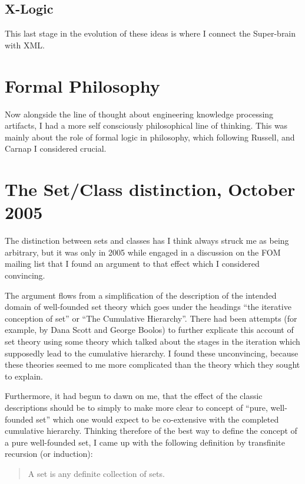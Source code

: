 \subsection{X-Logic}

This last stage in the evolution of these ideas is where I connect the Super-brain with XML.

\section{Formal Philosophy}

Now alongside the line of thought about engineering knowledge processing artifacts, I had a more self consciously philosophical line of thinking.
This was mainly about the role of formal logic in philosophy, which following Russell, and Carnap I considered crucial.

\section{The Set/Class distinction, October 2005}\label{October2005}

The distinction between sets and classes has I think always struck me as being arbitrary, but it was only in 2005 while engaged in a discussion on the FOM mailing list that I found an argument to that effect which I considered convincing.

The argument flows from a simplification of the description of the intended domain of well-founded set theory which goes under the headings ``the iterative conception of set'' or ``The Cumulative Hierarchy''.
There had been attempts (for example, by Dana Scott and George Boolos) to further explicate this account of set theory using some theory which talked about the stages in the iteration which supposedly lead to the cumulative hierarchy.
I found these unconvincing, because these theories seemed to me more complicated than the theory which they sought to explain.

Furthermore, it had begun to dawn on me, that the effect of the classic descriptions should be to simply to make more clear to concept of ``pure, well-founded set'' which one would expect to be co-extensive with the completed cumulative hierarchy.
Thinking therefore of the best way to define the concept of a pure well-founded set, I came up with the following definition by transfinite recursion (or induction):

\begin{quote}
A set is any definite collection of sets.
\end{quote}

